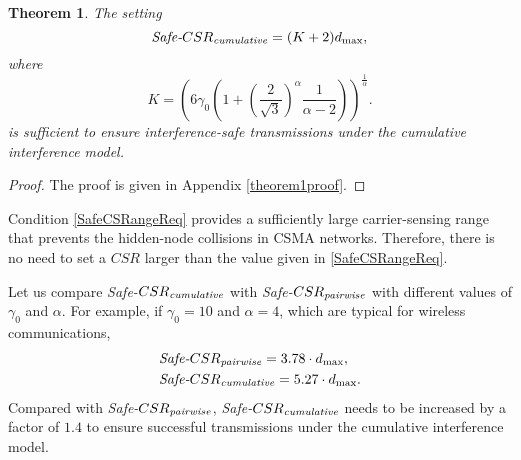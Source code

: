 \documentclass[conference]{IEEEtran}
\newtheorem{theorem}{Theorem}
\begin{document}
\begin{theorem}
\label{SafeCSRange} The setting
\begin{equation}
\emph{Safe-}CSR_{\text{\emph{cumulative}}}=(K+2)d_{\max}
\label{SafeCSRangeReq},
\end{equation}
where
\begin{equation}
K = \left( {6\gamma_0 \left( {1 + \left( {\frac{2}{\sqrt 3 }}
\right)^\alpha \frac{1}{\alpha - 2}} \right)}
\right)^{\frac{1}{\alpha }}. \label{KReq}
\end{equation}
is suff\/icient to ensure interference-safe transmissions under the
cumulative interference model.
\end{theorem}


\begin{proof}
The proof is given in Appendix \ref{theorem1proof}.
\end{proof}

Condition \eqref{SafeCSRangeReq} provides a suff\/iciently large
carrier-sensing range that prevents the hidden-node collisions in
CSMA networks. Therefore, there is no need to set a $CSR$ larger
than the value given in \eqref{SafeCSRangeReq}.





Let us compare \emph{Safe-}$CSR_\text{\emph{cumulative}}$ with
\emph{Safe-}$CSR_\text{\emph{pairwise}}$ with different values of
$\gamma_0$ and $\alpha$. For example, if $\gamma_0=10$ and
$\alpha=4$, which are typical for wireless communications,
\begin{align}
&\text{\emph{Safe-}}CSR_\text{\emph{pairwise}}=3.78\cdot d_{\max}
,\nonumber\\
&\text{\emph{Safe-}}CSR_\text{\emph{cumulative}}=5.27\cdot d_{\max}
\nonumber.
\end{align}
Compared with \emph{Safe-}$CSR_\text{\emph{pairwise}}$,
\emph{Safe-}$CSR_\text{\emph{cumulative}}$ needs to be increased by
a factor of $1.4$ to ensure successful transmissions under the
cumulative interference model.
\end{document}
